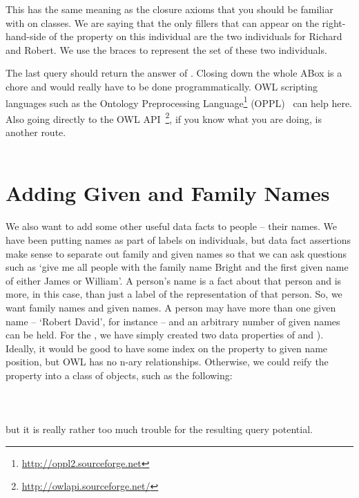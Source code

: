This has the same meaning as the closure axioms that you should be familiar with on classes. We are saying that the only fillers that can appear on the right-hand-side of the  property on this individual are the two individuals for Richard and Robert. We use the braces to represent the set of these two individuals.\herebedragons


The last query should return the answer of \ds. Closing down the whole \fhkb ABox is a chore and would really have to be done programmatically. OWL scripting languages such as the Ontology Preprocessing Language\footnote{\url{http://oppl2.sourceforge.net}} (OPPL)~\cite{oppl} can help here. Also going directly to the OWL API~\cite{owlapi}\footnote{\url{http://owlapi.sourceforge.net/}}, if you know what you are doing, is another route. 
\\\\




\section{Adding Given and Family Names}

We also want to add some other useful data facts to people -- their names. We have been putting names as part of labels on individuals, but data fact assertions make sense to separate out family and given names so that we can ask questions such as `give me all people with the family name Bright and the first given name of either James or William'. A person's name is a fact about that person and is more, in this case, than just a label of the representation of that person. So, we want family names and given names. A person may have more than one given name -- `Robert David', for instance -- and an arbitrary number of given names can be held. For the \fhkb, we have simply created two data properties of  and ). Ideally, it would be good to have some index on the property to given name position, but OWL has no n-ary relationships. Otherwise, we could reify the  property into a class of objects, such as the following:
\\\\
\\\\
\noindent but it is really rather too much trouble for the resulting query potential.


